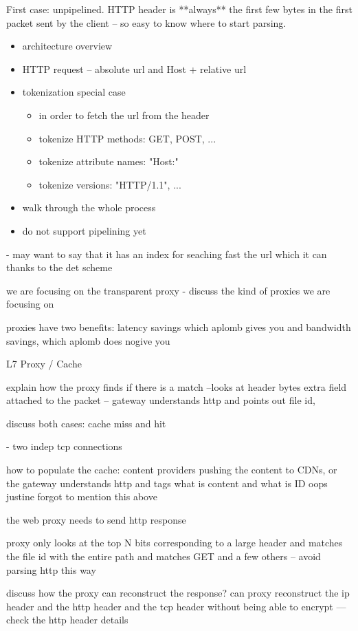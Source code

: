 First case: unpipelined. HTTP header is **always** the first few bytes in the first packet sent by the client -- so easy to know where to start parsing.
\begin{itemize}
\item architecture overview
\item HTTP request -- absolute url and Host + relative url
\item tokenization special case \\
    \begin{itemize}
    \item in order to fetch the url from the header
    \item tokenize HTTP methods: GET, POST, ...
    \item tokenize attribute names: "Host:"
    \item tokenize versions: "HTTP/1.1", ...
    \end{itemize}
\item walk through the whole process
\item do not support pipelining yet
\end{itemize}

- may want to say that it has an index for seaching fast the url which it can thanks to the det scheme


we are focusing on the transparent proxy
- discuss the kind of proxies we are focusing on

proxies have two benefits: latency savings which aplomb gives you 
and bandwidth savings, which aplomb does nogive you
 
L7 Proxy / Cache

explain how the proxy finds if there is  a match --looks at header bytes
extra field attached to the packet -- gateway understands http and points out file id, 

discuss both cases: cache miss and hit

- two indep tcp connections 

how to populate the cache: content providers pushing the content to CDNs, or the gateway understands
http and tags what is content and what is ID
oops justine forgot to mention this above

the web proxy needs to send http response 

proxy only looks at the top N bits corresponding to a large header and matches the file id with the entire path
and matches GET and a few others -- avoid parsing http this way


discuss how the proxy can reconstruct the response?
can proxy reconstruct the ip header and the http header  and the tcp header without being able to encrypt
--- check the http header details

